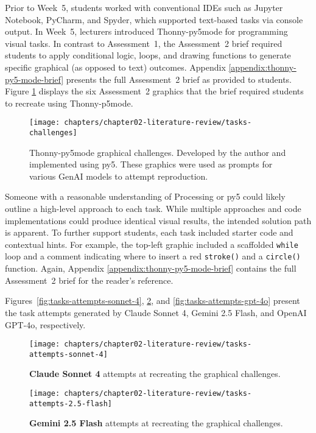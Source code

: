 Prior to Week~5, students worked with conventional IDEs such as Jupyter Notebook, PyCharm, and Spyder, which supported text-based tasks via console output. In Week~5, lecturers introduced Thonny-py5mode for programming visual tasks. In contrast to Assessment~1, the Assessment~2 brief required students to apply conditional logic, loops, and drawing functions to generate specific graphical (as opposed to text) outcomes. Appendix \ref{appendix:thonny-py5-mode-brief} presents the full Assessment~2 brief as provided to students. Figure \ref{fig:tasks-challenges} displays the six Assessment~2 graphics that the brief required students to recreate using Thonny-p5mode.

\begin{figure}[H]%
\centering
\texttt{[image: chapters/chapter02-literature-review/tasks-challenges]}
\caption{Thonny-py5mode graphical challenges. Developed by the author and implemented using py5. These graphics were used as prompts for various GenAI models to attempt reproduction.}
\label{fig:tasks-challenges}
\end{figure}

Someone with a reasonable understanding of Processing or py5 could likely outline a high-level approach to each task. While multiple approaches and code implementations could produce identical visual results, the intended solution path is apparent. To further support students, each task included starter code and contextual hints. For example, the top-left graphic included a scaffolded \texttt{while} loop and a comment indicating where to insert a red \texttt{stroke()} and a \texttt{circle()} function. Again, Appendix \ref{appendix:thonny-py5-mode-brief} contains the full Assessment~2 brief for the reader's reference.

Figures~\ref{fig:tasks-attempts-sonnet-4}, \ref{fig:tasks-attempts-2.5-flash}, and \ref{fig:tasks-attempts-gpt-4o} present the task attempts generated by Claude Sonnet 4, Gemini 2.5 Flash, and OpenAI GPT-4o, respectively. 

\begin{figure}[p]
  \vfill
  \centering
  \texttt{[image: chapters/chapter02-literature-review/tasks-attempts-sonnet-4]}
  \caption{\textbf{Claude Sonnet 4} attempts at recreating the graphical challenges.}
  \label{fig:tasks-attempts-sonnet-4}

  \vspace{2em}
  \texttt{[image: chapters/chapter02-literature-review/tasks-attempts-2.5-flash]}
  \caption{\textbf{Gemini 2.5 Flash} attempts at recreating the graphical challenges.}
  \label{fig:tasks-attempts-2.5-flash}
  \vfill
\end{figure}


